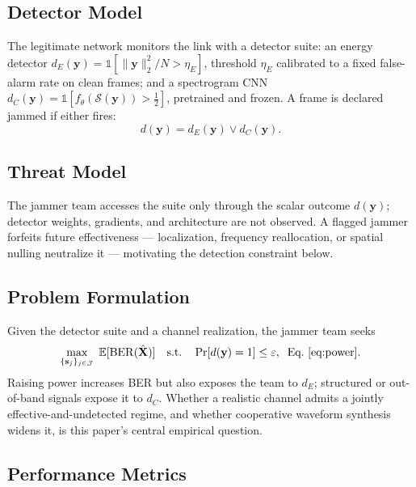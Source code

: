 \documentclass[conference]{IEEEtran}
\newcommand{\rar}[1]{{\color{blue}{[#1]}}}
\begin{document}
\subsection{Detector Model}
\label{sec:detector}
The legitimate network monitors the link with a detector suite: an energy
detector $d_E(\mathbf{y}) = \mathbb{1}[\|\mathbf{y}\|_2^2/N > \eta_E]$,
threshold $\eta_E$ calibrated to a fixed false-alarm rate on clean frames; and
a spectrogram CNN $d_C(\mathbf{y}) = \mathbb{1}[f_\theta(\mathcal{S}(\mathbf{y}))
> \tfrac12]$, pretrained and frozen. A frame is declared jammed if either
fires:
\begin{equation}
d(\mathbf{y}) = d_E(\mathbf{y}) \vee d_C(\mathbf{y}).
\label{eq:suite}
\end{equation}
\rar{Suite = energy + CNN; kurtosis/GLRT/pilot-variance may be added.}

\subsection{Threat Model}
The jammer team accesses the suite only through the scalar outcome
$d(\mathbf{y})$; detector weights, gradients, and architecture are not
observed. \rar{A learned cooperative jammer may instead use a
surrogate-gradient transfer attack, relaxing this to grey-box.} A flagged
jammer forfeits future effectiveness --- localization, frequency
reallocation, or spatial nulling neutralize it --- motivating the detection
constraint below. \rar{Physical-layer localization itself is out of scope.}

\subsection{Problem Formulation}
Given the detector suite and a channel realization, the jammer team seeks
\begin{equation}
\max_{\{\mathbf{s}_j\}_{j\in\mathcal{J}}} \; \mathbb{E}[\mathrm{BER}(\hat{\mathbf{X}})]
\quad \text{s.t.} \quad \Pr[d(\mathbf{y})=1]\leq\varepsilon,\;\;
\text{Eq.~\eqref{eq:power}}.
\label{eq:problem}
\end{equation}
Raising power increases BER but also exposes the team to $d_E$; structured or
out-of-band signals expose it to $d_C$. Whether a realistic channel admits a
jointly effective-and-undetected regime, and whether cooperative waveform
synthesis widens it, is this paper's central empirical question.
\subsection{Performance Metrics} \rar{maybe move into experimental setup}
\end{document}
